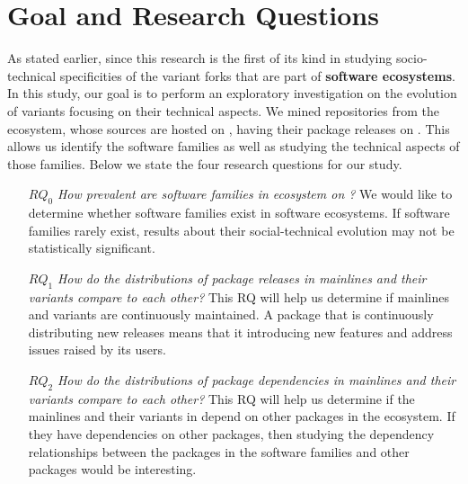 \section{Goal and Research Questions}
As stated earlier, since this research is the first of its kind in studying socio-technical specificities of the variant forks that are part of \textbf{software ecosystems}. In this study, our goal is to perform an exploratory investigation on the evolution of variants focusing on their technical aspects. We mined repositories from the \js ecosystem, whose sources are hosted on \gh, having their package releases on \npm. This allows us identify the software families as well as studying the technical aspects of those families.
Below we state the four research questions for our study.
\begin{itemize}
\item[\textbf{$RQ_0$}] \textit{How prevalent are software families in \js ecosystem on \gh?}
We would like to determine whether software families exist in software ecosystems. If software families rarely exist, results about their social-technical evolution may not be statistically significant.
\item[\textbf{$RQ_1$}] \textit{How do the distributions of package releases in mainlines and their variants compare to each other?}
This RQ will help us determine if mainlines and variants are continuously maintained. A package that is continuously distributing new releases means that it introducing new features and address issues raised by its users.


\item[\textbf{$RQ_2$}] \textit{How do the distributions of package dependencies in mainlines and their variants compare to each other?}
This RQ will help us determine if the mainlines and their variants in depend on other packages in the \np ecosystem. If they have dependencies on other packages, then studying the dependency relationships between the packages in the software families and other packages would be interesting.


\end{itemize}
